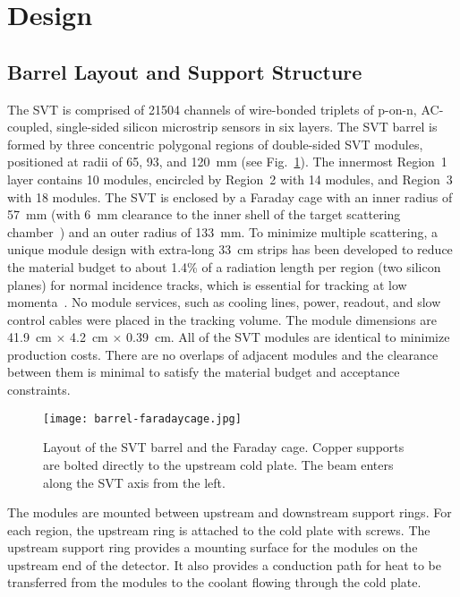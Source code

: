 \section{Design}

\subsection{Barrel Layout and Support Structure}

The SVT is comprised of 21504 channels of wire-bonded triplets of p-on-n, AC-coupled, single-sided silicon
microstrip sensors in six layers. The SVT barrel is formed by three concentric polygonal regions of double-sided
SVT modules, positioned at radii of 65, 93, and 120~mm (see Fig.~\ref{fig:barrel-faradaycage}). The innermost
Region~1 layer contains 10 modules, encircled by Region~2 with 14 modules, and Region~3 with 18 modules. The SVT
is enclosed by a Faraday cage with an inner radius of 57~mm (with 6~mm clearance to the inner shell of the target
scattering chamber~\cite{beamline-nim}) and an outer radius of 133~mm. To minimize multiple scattering, a unique
module design with extra-long 33~cm strips has been developed to reduce the material budget to about 1.4\% of a
radiation length per region (two silicon planes) for normal incidence tracks, which is essential for tracking at low
momenta~\cite{Vertex2016}. No module services, such as cooling lines, power, readout, and slow control cables were
placed in the tracking volume. The module dimensions are 41.9~cm $\times$ 4.2~cm $\times$ 0.39~cm. All of the
SVT modules are identical to minimize production costs. There are no overlaps of adjacent modules and the clearance
between them is minimal to satisfy the material budget and acceptance constraints.

\begin{figure}[h] 
\centering 
\texttt{[image: barrel-faradaycage.jpg]}
\caption{Layout of the SVT barrel and the Faraday cage. Copper supports are bolted directly to the upstream cold
  plate. The beam enters along the SVT axis from the left.}
\label{fig:barrel-faradaycage}
\end{figure}

The modules are mounted between upstream and downstream support rings. For each region, the upstream ring is
attached to the cold plate with screws. The upstream support ring provides a mounting surface for the modules on
the upstream end of the detector. It also provides a conduction path for heat to be transferred from the modules
to the coolant flowing through the cold plate. 

